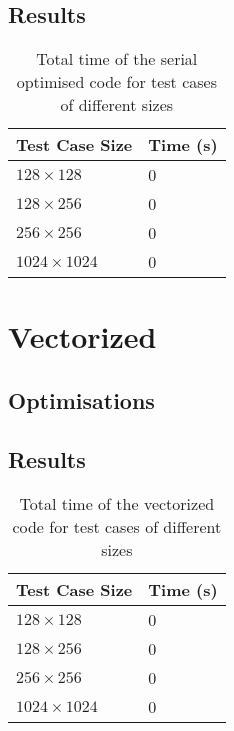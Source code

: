 \documentclass[11pt, twocolumn, a4paper]{article}
\begin{document}
\subsection{Results}

\begin{table}[htbp]
    \begin{center}
    \caption{Total time of the serial optimised code for test cases of different sizes}\label{tab:serial_optimised}
    \begin{tabular}{l | l} 
        \hline\hline
        Test Case Size&Time (s)\\
        \hline
        $128 \times 128$&0\\
        $128 \times 256$&0\\
        $256 \times 256$&0\\
        $1024 \times 1024$&0\\
        \hline
      \end{tabular}
    \end{center}
\end{table} 

\section{Vectorized}

\subsection{Optimisations}

\subsection{Results}

\begin{table}[htbp]
    \begin{center}
    \caption{Total time of the vectorized code for test cases of different sizes}\label{tab:vectorized}
    \begin{tabular}{l | l} 
        \hline\hline
        Test Case Size&Time (s)\\
        \hline
        $128 \times 128$&0\\
        $128 \times 256$&0\\
        $256 \times 256$&0\\
        $1024 \times 1024$&0\\
        \hline
      \end{tabular}
    \end{center}
\end{table} 
\end{document}
